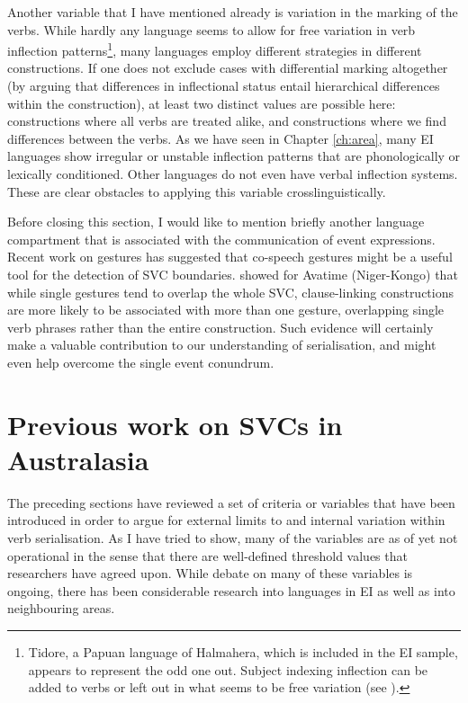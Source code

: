 Another variable that I have mentioned already is variation in the marking of the verbs. While hardly any language seems to allow for free variation in verb inflection patterns\footnote{Tidore, a Papuan language of Halmahera, which is included in the EI sample, appears to represent the odd one out. Subject indexing inflection can be added to verbs or left out in what seems to be free variation (see \citealt{vanstaden2000tidore}).}, many languages employ different strategies in different constructions. If one does not exclude cases with differential marking altogether (by arguing that differences in inflectional status entail hierarchical differences within the construction), at least two distinct values are possible here: constructions where all verbs are treated alike, and constructions where we find differences between the verbs. As we have seen in  Chapter \ref{ch:area}, many EI languages show irregular or unstable inflection patterns that are phonologically or lexically conditioned. Other languages do not even have verbal inflection systems. These are clear obstacles to applying this variable crosslinguistically.

Before closing this section, I would like to mention briefly another language compartment that is associated with the communication of event expressions. Recent work on gestures has suggested that co-speech gestures might be a useful tool for the detection of SVC boundaries. \citet{defina2016serial} showed for Avatime (Niger-Kongo) that while single gestures tend to overlap the whole SVC, clause-linking constructions are more likely to be associated with more than one gesture, overlapping single verb phrases rather than the entire construction. Such evidence will certainly make a valuable contribution to our understanding of serialisation, and might even help overcome the single event conundrum.

\section{Previous work on SVCs in Australasia} \label{previouswork}

The preceding sections have reviewed a set of criteria or variables that have been introduced in order to argue for external limits to and internal variation within verb serialisation. As I have tried to show, many of the variables are as of yet not operational in the sense that there are well-defined threshold values that researchers have agreed upon. While debate on many of these variables is ongoing, there has been considerable research into languages in EI as well as into neighbouring areas. 

